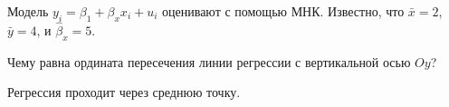
\begin{question}
Модель \(y_i = \beta_1 + \beta_x x_i + u_i\) оценивают с помощью МНК.
Известно, что \(\bar x= 2\), \(\bar y = 4\), и \(\hat \beta_x = 5\).

Чему равна ордината пересечения линии регрессии с вертикальной осью \(Oy\)?
\end{question}

\begin{solution}
Регрессия проходит через среднюю точку.
\end{solution}

